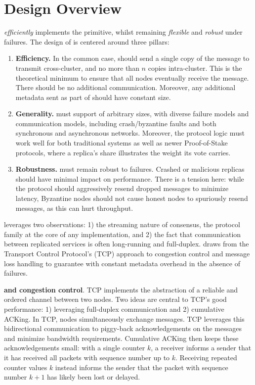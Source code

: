 \section{Design Overview}
\label{s:design}

\Scrooge{} \textit{efficiently} implements the \CCC{} primitive, whilst remaining \textit{flexible} and \textit{robust} under failures. The design of \Scrooge{} is centered around three pillars:
\begin{enumerate}[wide,nosep,label=(P\arabic*),ref={P\arabic*}]

\item \label{g:zero} {\bf Efficiency.} In the common case, \Scrooge{} should send a single copy of the message to transmit cross-cluster, and no more than $n$ copies intra-cluster. This is the theoretical minimum to ensure that all nodes eventually receive the message.  There should be no additional communication. Moreover, any additional metadata sent as part of \Scrooge{} should have constant size.
\item \label{g:hetero} {\bf Generality.} \Scrooge{} must support  of arbitrary sizes, with diverse failure models and communication models, including crash/byzantine faults and both synchronous and asynchronous networks. Moreover, the protocol logic must work well for both traditional \BFT{} systems as well as newer Proof-of-Stake protocols, where a replica's share illustrates the weight its vote carries.

\item \label{g:failures} {\bf Robustness.} \Scrooge{} must remain robust to failures. Crashed or malicious replicas should have minimal impact on performance. There is a tension here: while the protocol should aggressively resend dropped messages
to minimize latency,  Byzantine nodes should not cause honest nodes to spuriously resend messages, as this can hurt throughput.
 
\end{enumerate}

\Scrooge{} leverages two observations: 1) the streaming nature of consensus, the protocol family at the core of any \RSM{} implementation, and 2) the fact that communication between replicated services is often long-running and full-duplex.
\Scrooge{} draws from the Transport Control Protocol's (TCP) approach to congestion control and message loss handling to guarantee \CCC{} with constant metadata overhead in the absence of failures.

\par \textbf{\CCC{} and congestion control}. TCP implements the abstraction of a reliable and ordered channel between two nodes. Two ideas are central to TCP's good performance: 1) leveraging full-duplex communication and 2) cumulative ACKing. In TCP, nodes simultaneously exchange messages. TCP leverages this bidirectional communication to piggy-back acknowledgements on the messages and minimize bandwidth requirements. Cumulative ACKing  then keeps these acknowledgements small: with a single counter $k$, a receiver informs a sender that it has received all packets with sequence number up to $k$. 
Receiving repeated counter values $k$ instead informs the sender that the packet with sequence number $k+1$ has likely been lost or delayed.

